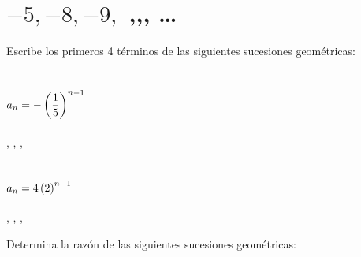 \documentclass[12pt,addpoints,answers]{evalua}
\begin{document}
\begin{questions}
\begin{multicols}{2}
\begin{parts}
            \begin{solutionbox}{2.5cm}\large
            \end{solutionbox}

            \part {\large $-5,-8,-9,$ \fillin[-8][0.5cm],\fillin[-5][0.5cm],\fillin[0][0.5cm], \dots}

            \begin{solutionbox}{2.5cm}\large
            \end{solutionbox}

        \end{parts}
    \end{multicols}


    \question[] Escribe los primeros 4 términos de las siguientes sucesiones geométricas:
    \begin{multicols}{2}
        \begin{parts}
            \part {\large $\large a_{n}=-\left( \dfrac{1}{5}\right)^{n-1}$}

            \begin{solutionbox}{2cm}
                \fillin[$-1$][0cm], \fillin[$-\dfrac{1}{5}$][0cm], \fillin[$-\dfrac{1}{25}$][0cm], \fillin[$-\dfrac{1}{125}$][0cm]
            \end{solutionbox}

            \part {\large $\large a_{n}=4\left( 2\right)^{n-1}$}

            \begin{solutionbox}{2cm}
                \fillin[$4$][0cm], \fillin[$8$][0cm], \fillin[$16$][0cm], \fillin[$32$][0cm]
            \end{solutionbox}
        \end{parts}
    \end{multicols}

    \question[] Determina la razón de las siguientes sucesiones geométricas:
    \begin{multicols}{2}
        \begin{parts}

\end{parts}
\end{multicols}
\end{questions}
\end{document}
